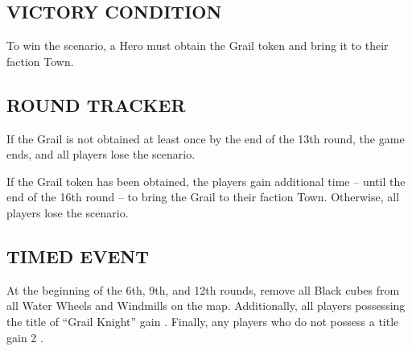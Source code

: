 \begin{multicols*}{2}
\subsection*{\MakeUppercase{Victory Condition}}
To win the scenario, a Hero must obtain the Grail token and bring it to their faction Town.
\subsection*{\MakeUppercase{Round Tracker}}
If the Grail is not obtained at least once by the end of the 13th round, the game ends, and all players lose the scenario.

If the Grail token has been obtained, the players gain additional time – until the end of the 16th round – to bring the Grail to their faction Town. Otherwise, all players lose the scenario.
\subsection*{\MakeUppercase{Timed Event}}
At the beginning of the 6th, 9th, and 12th rounds, remove all Black cubes from all Water Wheels and Windmills on the map. Additionally, all players possessing the title of “\textcolor{airforceblue}{Grail Knight}” gain . Finally, any players who do not possess a title gain 2 .
\end{multicols*}
